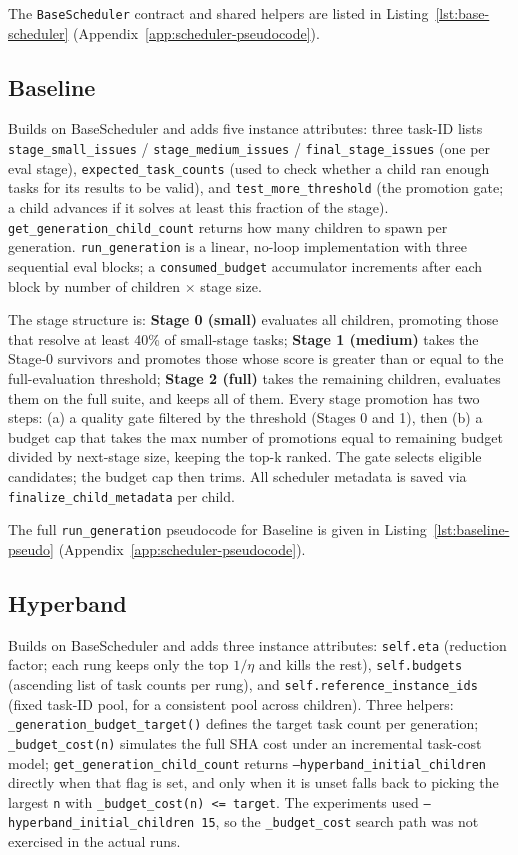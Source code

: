 The \texttt{BaseScheduler} contract and shared helpers are listed in
Listing~\ref{lst:base-scheduler}
(Appendix~\ref{app:scheduler-pseudocode}).

\subsection{Baseline}

Builds on BaseScheduler and adds five instance attributes: three task-ID
lists \texttt{stage\_small\_issues} / \texttt{stage\_medium\_issues} /
\texttt{final\_stage\_issues} (one per eval stage),
\texttt{expected\_task\_counts} (used to check whether a child ran enough
tasks for its results to be valid), and \texttt{test\_more\_threshold}
(the promotion gate; a child advances if it solves at least this fraction
of the stage). \texttt{get\_generation\_child\_count} returns how many
children to spawn per generation. \texttt{run\_generation} is a linear,
no-loop implementation with three sequential eval blocks; a
\texttt{consumed\_budget} accumulator increments after each block by
number of children $\times$ stage size.

The stage structure is: \textbf{Stage 0 (small)} evaluates all children,
promoting those that resolve at least 40\% of small-stage tasks;
\textbf{Stage 1 (medium)} takes the Stage-0 survivors and promotes those
whose score is greater than or equal to the full-evaluation threshold;
\textbf{Stage 2 (full)} takes the remaining children, evaluates them on the
full suite, and keeps all of them. Every stage promotion has two steps:
(a) a quality gate filtered by the threshold (Stages 0 and 1), then (b) a
budget cap that takes the max number of promotions equal to remaining
budget divided by next-stage size, keeping the top-k ranked. The gate
selects eligible candidates; the budget cap then trims. All scheduler
metadata is saved via \texttt{finalize\_child\_metadata} per child.

The full \texttt{run\_generation} pseudocode for Baseline is given in
Listing~\ref{lst:baseline-pseudo}
(Appendix~\ref{app:scheduler-pseudocode}).

\subsection{Hyperband}

Builds on BaseScheduler and adds three instance attributes:
\texttt{self.eta} (reduction factor; each rung keeps only the top
$1/\eta$ and kills the rest), \texttt{self.budgets} (ascending list of
task counts per rung), and \texttt{self.reference\_instance\_ids} (fixed
task-ID pool, for a consistent pool across children). Three helpers:
\texttt{\_generation\_budget\_target()} defines the target task count per
generation; \texttt{\_budget\_cost(n)} simulates the full SHA cost under
an incremental task-cost model;
\texttt{get\_generation\_child\_count} returns
\texttt{--hyperband\_initial\_children} directly when that flag is set,
and only when it is unset falls back to picking the largest \texttt{n}
with \texttt{\_budget\_cost(n) <= target}. The experiments used
\texttt{--hyperband\_initial\_children 15}, so the
\texttt{\_budget\_cost} search path was not exercised in the actual runs.

